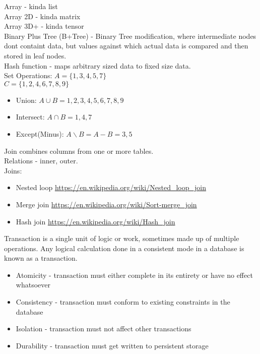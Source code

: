 \documentclass{article}
\begin{document}
    Array - kinda list \\
    Array 2D - kinda matrix \\
    Array 3D+ - kinda tensor \\

    Binary Plus Tree (B+Tree) - Binary Tree modification, where intermediate nodes dont containt data,
        but values against which actual data is compared and then stored in leaf nodes. \\
    
    Hash function - maps arbitrary sized data to fixed size data. \\

    Set Operations:
    $A = \{1,    3, 4, 5,    7      \}$ \\
    $C = \{1, 2,    4,    6, 7, 8, 9\}$
    \begin{itemize}
        \item Union:         $A \cup       B         = {1, 2, 3, 4, 5, 6, 7, 8, 9}$
        \item Intersect:     $A \cap       B         = {1, 4, 7}$
        \item Except(Minus): $A \backslash B = A - B = {3, 5}$
    \end{itemize}

    Join combines columns from one or more tables. \\
    Relations - inner, outer. \\
    Joins:
    \begin{itemize}
        \item Nested loop \url{https://en.wikipedia.org/wiki/Nested_loop_join}
        \item Merge join \url{https://en.wikipedia.org/wiki/Sort-merge_join}
        \item Hash join \url{https://en.wikipedia.org/wiki/Hash_join}
    \end{itemize}

    Transaction is a single unit of logic or work, sometimes made up of multiple operations.
    Any logical calculation done in a consistent mode in a database is known as a transaction.
    \begin{itemize}
        \item Atomicity   - transaction must either complete in its entirety or have no effect whatsoever
        \item Consistency - transaction must conform to existing constraints in the database
        \item Isolation   - transaction must not affect other transactions
        \item Durability  - transaction must get written to persistent storage
    \end{itemize}
\end{document}
